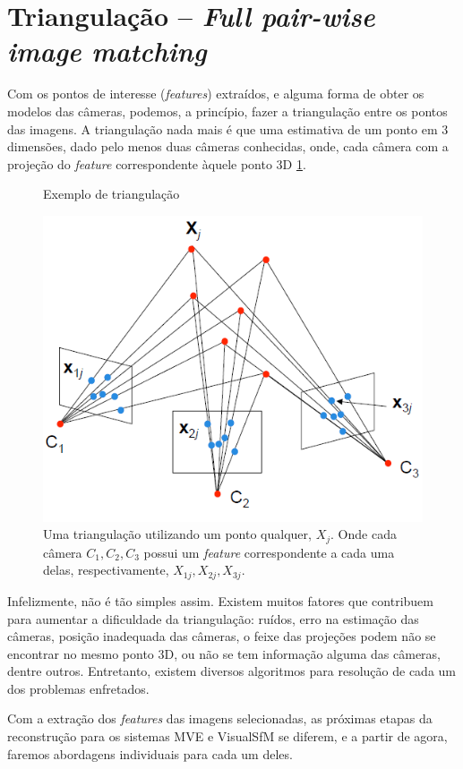 \section{Triangulação -- \emph{Full pair-wise image matching}}

Com os pontos de interesse (\emph{features}) extraídos, e alguma forma de
obter os modelos das câmeras, podemos, a princípio, fazer a
triangulação entre os pontos das imagens.  
A triangulação nada mais é que uma estimativa de um ponto em 3 dimensões, dado
pelo menos duas câmeras conhecidas, onde, cada câmera com a projeção do
\emph{feature} correspondente àquele ponto 3D \ref{fig:triangulacao}.

\begin{figure} [!h]
	\centering
	\caption{Exemplo de triangulação}
	\includegraphics[width=0.45\linewidth]{figs/triangulacao.png}
	\caption{%
	Uma triangulação utilizando um ponto qualquer, $X_j$. Onde cada câmera $C_1, C_2, C_3$ possui um \emph{feature} correspondente a cada uma delas, respectivamente, $X_{1j}, X_{2j}, X_{3j}$.
	}
	\label{fig:triangulacao}
\end{figure}

Infelizmente, não é tão simples assim. Existem muitos fatores que contribuem
para aumentar a dificuldade da triangulação: ruídos, erro na estimação das
câmeras, posição inadequada das câmeras, o
feixe das projeções podem não se encontrar no mesmo ponto 3D, ou não se tem
informação alguma das câmeras, dentre outros. Entretanto, existem diversos algoritmos
para resolução de cada um dos problemas enfretados. 

Com a extração dos \emph{features} das imagens selecionadas, as próximas etapas
da reconstrução para os sistemas MVE e VisualSfM se diferem, e a partir de
agora, faremos abordagens individuais para cada um deles.



